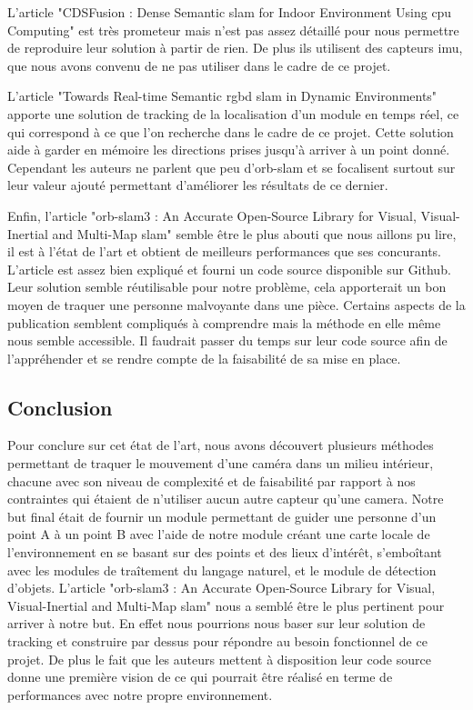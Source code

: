 \documentclass[11pt]{article}
\begin{document}
      L'article "CDSFusion : Dense Semantic \acrshort{slam} for Indoor Environment Using \acrshort{cpu} Computing" est très prometeur mais n'est pas assez détaillé 
      pour nous permettre de reproduire leur solution à partir de rien. De plus ils utilisent des capteurs \acrshort{imu}, que nous avons convenu de ne pas 
      utiliser dans le cadre de ce projet.

      L'article "Towards Real-time Semantic \acrshort{rgbd} \acrshort{slam} in Dynamic Environments" apporte une solution de tracking de la localisation 
      d'un module en temps réel, ce qui correspond à ce que l'on recherche dans le cadre de ce projet. Cette solution aide à garder en 
      mémoire les directions prises jusqu'à arriver à un point donné. Cependant les auteurs ne parlent que peu d'\acrshort{orb}-\acrshort{slam} et se focalisent 
      surtout sur leur valeur ajouté permettant d'améliorer les résultats de ce dernier.

      Enfin, l'article "\acrshort{orb}-\acrshort{slam}3 : An Accurate Open-Source Library for Visual, Visual-Inertial and Multi-Map \acrshort{slam}" semble être le plus abouti
      que nous aillons pu lire, il est à l'état de l'art et obtient de meilleurs performances que ses concurants. L'article est assez bien expliqué
      et fourni un code source disponible sur Github. Leur solution semble réutilisable pour notre problème, cela apporterait un bon moyen
      de traquer une personne malvoyante dans une pièce. Certains aspects de la publication semblent compliqués à comprendre mais la méthode en 
      elle même nous semble accessible. Il faudrait passer du temps sur leur code source afin de l'appréhender et se rendre compte de la faisabilité
      de sa mise en place.

    \pagebreak

    \subsection{Conclusion}
      Pour conclure sur cet état de l'art, nous avons découvert plusieurs méthodes permettant de traquer le mouvement d'une caméra dans un
      milieu intérieur, chacune avec son niveau de complexité et de faisabilité par rapport à nos contraintes qui étaient de n'utiliser aucun
      autre capteur qu'une camera. Notre but final était de fournir un module permettant de guider une personne d'un point A à un point B avec 
      l'aide de notre module créant une carte locale de l'environnement en se basant sur des points et des lieux d'intérêt, 
      s'emboîtant avec les modules de traîtement du langage naturel, et le module de détection d'objets. 
      L'article "\acrshort{orb}-\acrshort{slam}3 : An Accurate Open-Source Library for Visual, Visual-Inertial and Multi-Map \acrshort{slam}" 
      nous a semblé être le plus pertinent pour arriver à notre but. En effet nous pourrions nous baser sur leur solution de tracking et construire 
      par dessus pour répondre au besoin fonctionnel de ce projet.
      De plus le fait que les auteurs mettent à disposition leur code source donne une première vision de ce qui pourrait être réalisé en terme de 
      performances avec notre propre environnement.
\end{document}
